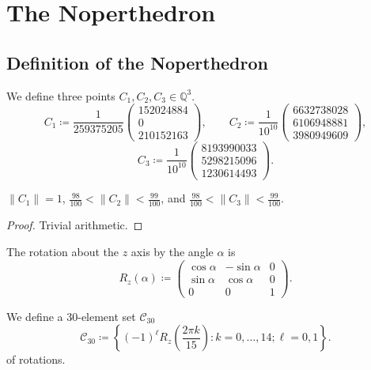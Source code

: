 \chapter{The Noperthedron}
\label{chap:noperthedron}

\section{Definition of the Noperthedron}

We define three points $C_1,C_2,C_3\in \mathbb{Q}^3$.
\[
    C_1\coloneqq
        \frac{1}{259375205}
        \begin{pmatrix}
        {152024884} \\ 0 \\ {210152163}
        \end{pmatrix},
\qquad
    C_2\coloneqq \frac{1}{10^{10}}
        \begin{pmatrix}
        6632738028 \\ 6106948881 \\ 3980949609
        \end{pmatrix},
\]
\[
    C_3\coloneqq
        \frac{1}{10^{10}}
        \begin{pmatrix}
        8193990033 \\ 5298215096 \\ 1230614493
        \end{pmatrix}.
\]

\begin{lemma}
\label{lem:c1_c2_c3_norms}
\leanok
$\| C_1 \| = 1$,
$\frac{98}{100} < \| C_2 \| < \frac{99}{100}$, and
$\frac{98}{100} < \| C_3 \| < \frac{99}{100}$.
\end{lemma}
\begin{proof}
\leanok
Trivial arithmetic.
\end{proof}

The rotation about the $z$ axis by the angle $\alpha$ is
    \[
        R_z(\alpha)\coloneqq
        \begin{pmatrix}
            \cos\alpha & -\sin\alpha &0\\
            \sin\alpha & \cos\alpha &0\\
            0 & 0 & 1
        \end{pmatrix}.
    \]

We define a 30-element set $\mathcal{C}_{30}$
\[
    \mathcal{C}_{30} \coloneqq \left\{(-1)^\ell R_z\left(\frac{2\pi k}{15}\right) \colon k=0,\dots,14; \ell=0,1\right\}.
\]
of rotations.

